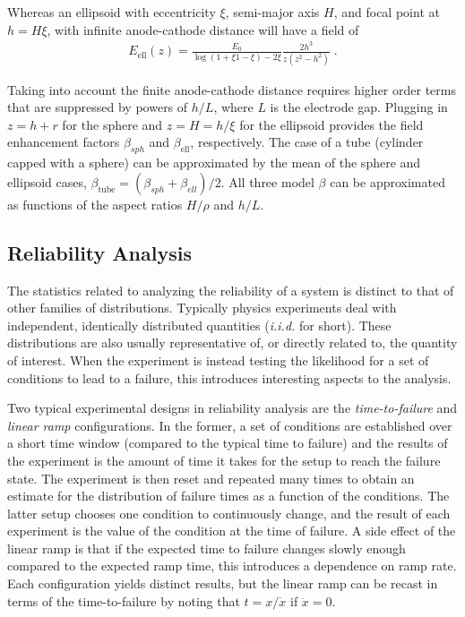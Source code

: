  Whereas an ellipsoid with eccentricity $\xi$, semi-major axis $H$, and focal point at $h=H\xi$, with infinite anode-cathode distance will have a field of
  \begin{align}
     E_{\text{ell}}(z) = \frac{E_0}{\log ({1 + \xi}{1- \xi}) - 2 \xi }\frac{2h^3}{z(z^2-h^2)}\;.
\end{align}

Taking into account the finite anode-cathode distance requires higher order terms that are suppressed by powers of $h/L$, where $L$ is the electrode gap.
Plugging in $z = h+r$ for the sphere and $z = H = h /\xi$ for the ellipsoid provides the field enhancement factors $\beta_{sph}$ and $\beta_{\text{ell}}$, respectively.
The case of a tube (cylinder capped with a sphere) can be approximated by the mean of the sphere and ellipsoid cases, $\beta_{\text{tube}} = (\beta_{sph} + \beta_{ell})/2 $\cite{pogorelov_enhancement_2009}.
All three model $\beta$ can be approximated as functions of the aspect ratios $H/\rho$ and $h/L$.
\subsection{Reliability Analysis}
\label{sec:hazard_functions}
The statistics related to analyzing the reliability of a system is distinct to that of other families of distributions.
Typically physics experiments deal with independent, identically distributed quantities (\textit{i.i.d.} for short).
These distributions are also usually representative of, or directly related to, the quantity of interest.
When the experiment is instead testing the likelihood for a set of conditions to lead to a failure, this introduces interesting aspects to the analysis.

Two typical experimental designs in reliability analysis are the \textit{time-to-failure} and \textit{linear ramp} configurations.
In the former, a set of conditions are established over a short time window (compared to the typical time to failure) and the results of the experiment is the amount of time it takes for the setup to reach the failure state.
The experiment is then reset and repeated many times to obtain an estimate for the distribution of failure times as a function of the conditions.
The latter setup chooses one condition to continuously change, and the result of each experiment is the value of the condition at the time of failure.
A side effect of the linear ramp is that if the expected time to failure changes slowly enough compared to the expected ramp time, this introduces a dependence on ramp rate.
Each configuration yields distinct results, but the linear ramp can be recast in terms of the time-to-failure by noting that $t = x/\dot{x}$ if $\ddot{x}=0$.

